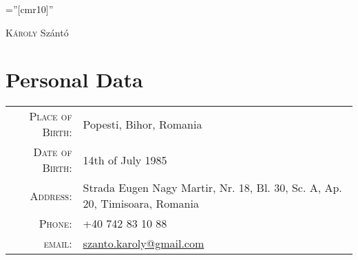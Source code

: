 \documentclass[a4paper,10pt]{article}
\begin{document}
\pagestyle{plain} %

\font\fb=''[cmr10]'' %

 
\par{\centering
		{\Huge \textsc{K\'aroly} Sz\'ant\'o
	}\bigskip\par}
	
\section{Personal Data}

\begin{tabular}{rl}
    \textsc{Place of Birth:} & Popesti, Bihor, Romania\\
    \textsc{Date of Birth:}  & 14th of July 1985 \\
    \textsc{Address:}         & Strada Eugen Nagy Martir, Nr. 18, Bl. 30, Sc. A, Ap. 20, Timisoara, Romania\\
    \textsc{Phone:}     	 & +40 742 83 10 88\\
    \textsc{email:}     	 &
    \href{mailto:szanto.karoly@gmail.com}{szanto.karoly@gmail.com}
\end{tabular}

\end{document}

